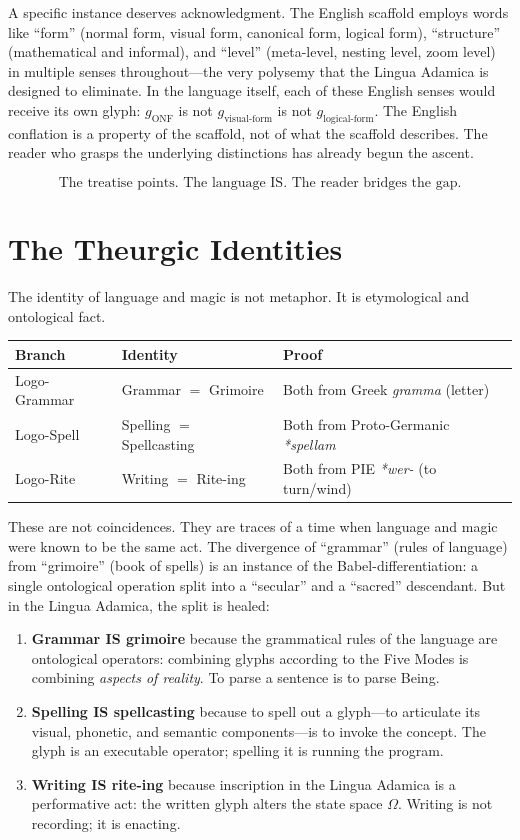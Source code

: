 \documentclass[12pt, letterpaper]{book}
\def\mathfrak#1{#1}%
\begin{document}
A specific instance deserves acknowledgment. The English scaffold employs words like ``form'' (normal form, visual form, canonical form, logical form), ``structure'' (mathematical and informal), and ``level'' (meta-level, nesting level, zoom level) in multiple senses throughout---the very polysemy that the Lingua Adamica is designed to eliminate. In the language itself, each of these English senses would receive its own glyph: $\mathfrak{g}_{\text{ONF}}$ is not $\mathfrak{g}_{\text{visual-form}}$ is not $\mathfrak{g}_{\text{logical-form}}$. The English conflation is a property of the scaffold, not of what the scaffold describes. The reader who grasps the underlying distinctions has already begun the ascent.

\[
\boxed{\text{The treatise points. The language IS. The reader bridges the gap.}}
\]


\section{The Theurgic Identities}

The identity of language and magic is not metaphor. It is etymological and ontological fact.

\begin{center}
\begin{tabular}{lll}
\toprule
\textbf{Branch} & \textbf{Identity} & \textbf{Proof} \\
\midrule
Logo-Grammar & Grammar $=$ Grimoire & Both from Greek \textit{gramma} (letter) \\
Logo-Spell & Spelling $=$ Spellcasting & Both from Proto-Germanic \textit{*spellam} \\
Logo-Rite & Writing $=$ Rite-ing & Both from PIE \textit{*wer-} (to turn/wind) \\
\bottomrule
\end{tabular}
\end{center}

These are not coincidences. They are traces of a time when language and magic were known to be the same act. The divergence of ``grammar'' (rules of language) from ``grimoire'' (book of spells) is an instance of the Babel-differentiation: a single ontological operation split into a ``secular'' and a ``sacred'' descendant. But in the Lingua Adamica, the split is healed:

\begin{enumerate}[label=(\roman*)]
\item \textbf{Grammar IS grimoire} because the grammatical rules of the language are ontological operators: combining glyphs according to the Five Modes is combining \textit{aspects of reality}. To parse a sentence is to parse Being.
\item \textbf{Spelling IS spellcasting} because to spell out a glyph---to articulate its visual, phonetic, and semantic components---is to invoke the concept. The glyph is an executable operator; spelling it is running the program.
\item \textbf{Writing IS rite-ing} because inscription in the Lingua Adamica is a performative act: the written glyph alters the state space $\Omega$. Writing is not recording; it is enacting.
\end{enumerate}
\end{document}
